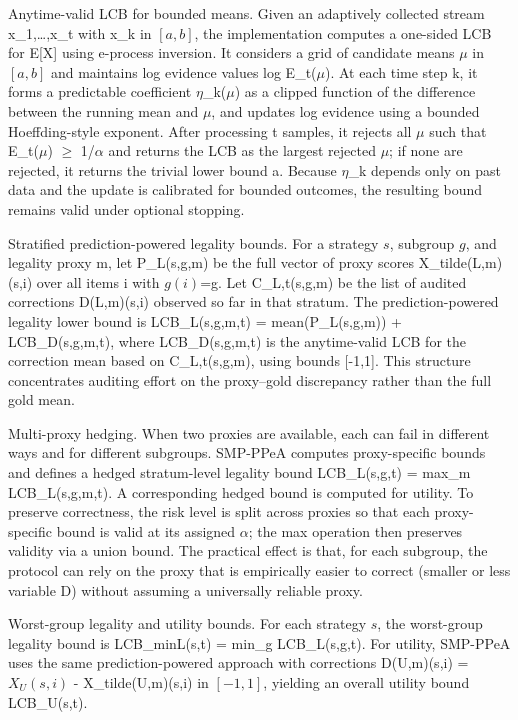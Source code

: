 \documentclass{article} %
\begin{document}
Anytime-valid LCB for bounded means. Given an adaptively collected stream x_1,\ldots{},x_t with x_k in $[a,b]$, the implementation computes a one-sided LCB for E[X] using e-process inversion. It considers a grid of candidate means \ensuremath{\mu} in $[a,b]$ and maintains log evidence values log E_t(\ensuremath{\mu}). At each time step k, it forms a predictable coefficient \ensuremath{\eta}_k(\ensuremath{\mu}) as a clipped function of the difference between the running mean and \ensuremath{\mu}, and updates log evidence using a bounded Hoeffding-style exponent. After processing t samples, it rejects all \ensuremath{\mu} such that E_t(\ensuremath{\mu}) \ensuremath{\geq} 1/\ensuremath{\alpha} and returns the LCB as the largest rejected \ensuremath{\mu}; if none are rejected, it returns the trivial lower bound a. Because \ensuremath{\eta}_k depends only on past data and the update is calibrated for bounded outcomes, the resulting bound remains valid under optional stopping.

Stratified prediction-powered legality bounds. For a strategy $s$, subgroup $g$, and legality proxy m, let P_L(s,g,m) be the full vector of proxy scores X_tilde(L,m)(s,i) over all items i with $g(i)$=g. Let C_L,t(s,g,m) be the list of audited corrections D(L,m)(s,i) observed so far in that stratum. The prediction-powered legality lower bound is
LCB_L(s,g,m,t) = mean(P_L(s,g,m)) + LCB_D(s,g,m,t),
where LCB_D(s,g,m,t) is the anytime-valid LCB for the correction mean based on C_L,t(s,g,m), using bounds [-1,1]. This structure concentrates auditing effort on the proxy--gold discrepancy rather than the full gold mean.

Multi-proxy hedging. When two proxies are available, each can fail in different ways and for different subgroups. SMP-PPeA computes proxy-specific bounds and defines a hedged stratum-level legality bound
LCB_L(s,g,t) = max_m LCB_L(s,g,m,t).
A corresponding hedged bound is computed for utility. To preserve correctness, the risk level is split across proxies so that each proxy-specific bound is valid at its assigned \ensuremath{\alpha}; the max operation then preserves validity via a union bound. The practical effect is that, for each subgroup, the protocol can rely on the proxy that is empirically easier to correct (smaller or less variable D) without assuming a universally reliable proxy.

Worst-group legality and utility bounds. For each strategy $s$, the worst-group legality bound is
LCB_minL(s,t) = min_g LCB_L(s,g,t).
For utility, SMP-PPeA uses the same prediction-powered approach with corrections D(U,m)(s,i) = $X_U(s,i)$ - X_tilde(U,m)(s,i) in $[-1,1]$, yielding an overall utility bound LCB_U(s,t).
\end{document}
